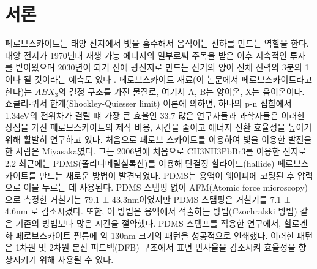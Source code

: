 
\section{서론}

페로브스카이트는 태양 전지에서 빛을 흡수해서 움직이는 전하를 만드는 역할을 한다. 태양 전지가 1970년대 재생 가능 에너지의 일부로써 주목을 받은 이후 지속적인 투자를 받아왔으며 2030년이 되기 전에 광전지로 만드는 전기의 양이 전체 전력의 3분의 1이나 될 것이라는 예측도 있다 \cite{turner2013global}. 페로브스카이트 재료(이 논문에서 페로브스카이트라고 한다)는 $ABX_3$의 결정 구조를 가진 물질로, 여기서 A, B는 양이온, X는 음이온이다. 쇼클리-퀴서 한계(Shockley-Quiesser limit) 이론에 의하면, 하나의 p-n 접합에서 1.34eV의 전위차가 걸릴 떄 가장 큰 효율인 33.7%
많은 연구자들과 과학자들은 이러한 장점을 가진 페로브스카이트의 제작 비용, 시간을 줄이고 에너지 전환 효율성을 높이기 위해 활발히 연구하고 있다. 처음으로 페로브 스카이트를 이용하여 빛을 이용한 발전을 한 사람은 Miyasaka였다. 그는 2006년에 처음으로 CH3NH3PbBr3를 이용한 전지로 2.2%
최근에는 PDMS(폴리디메틸실록산)를 이용해 단결정 할라이드(hallide) 페로브스카이트를 만드는 새로운 방법이 발견되었다. PDMS는 용액이 웨이퍼에 코팅된 후 압력으로 이을 누르는 데 사용된다. PDMS 스탬핑 없이 AFM(Atomic force microscopy)으로 측정한 거칠기는 79.1 ± 43.3nm이었지만 PDMS 스탬핑은 거칠기를 7.1 ± 4.6nm 로 감소시켰다\cite{khoram2016growth}. 또한, 이 방법은 용액에서 석출하는 방법(Czochralski 방법) 같은 기존의 방법보다 많은 시간을 절약했다. PDMS 스탬프를 적용한 연구에서, 할로겐화 페로브스카이트 필름에 약 130nm 크기의 패턴을 성공적으로 인쇄했다\cite{brittman2017controlling}. 이러한 패턴은 1차원 및 2차원 분산 피드백(DFB) 구조에서 표면 반사율을 감소시켜 효율성을 향상시키기 위해 사용될 수 있다. 
